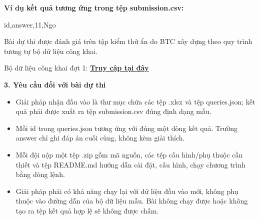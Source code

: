 \documentclass[12pt,a4paper]{article}
\begin{document}
\begin{tcolorbox}
\end{tcolorbox}

\newpage

\textbf{Ví dụ kết quả tương ứng trong tệp submission.csv:}

\begin{tcolorbox}[codebox]
id,answer,11,Ngo
\end{tcolorbox}

Bài dự thi được đánh giá trên tập kiểm thử ẩn do BTC xây dựng theo quy trình tương tự bộ dữ liệu công khai.

Bộ dữ liệu công khai đợt 1: \textbf{\href{https://drive.google.com/drive/folders/1IiEl_weVjIdd1xlnhtiuY-NzmiThXa4o?usp=sharing}{\underline{Truy cập tại đây}}}

\textbf{3. Yêu cầu đối với bài dự thi}

\begin{itemize}[leftmargin=1.5em, itemsep=2pt, topsep=1pt, parsep=0pt, label=--]
    \item Giải pháp nhận đầu vào là thư mục chứa các tệp .xlsx và tệp queries.json; kết quả phải được xuất ra tệp submission.csv đúng định dạng mẫu.
    \item Mỗi id trong queries.json tương ứng với đúng một dòng kết quả. Trường answer chỉ ghi đáp án cuối cùng, không kèm giải thích.
    \item Mỗi đội nộp một tệp .zip gồm mã nguồn, các tệp cấu hình/phụ thuộc cần thiết và tệp README.md hướng dẫn cài đặt, cấu hình, chạy chương trình bằng dòng lệnh.
    \item Giải pháp phải có khả năng chạy lại với dữ liệu đầu vào mới, không phụ thuộc vào đường dẫn của bộ dữ liệu mẫu. Bài không chạy được hoặc không tạo ra tệp kết quả hợp lệ sẽ không được chấm.
\end{itemize}
\end{document}
